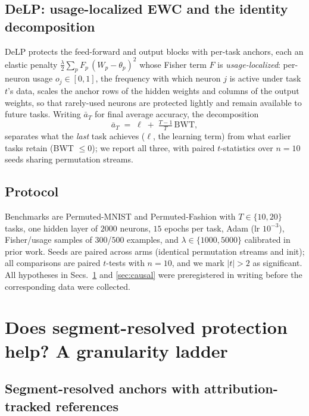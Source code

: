 \documentclass[review,12pt,number]{elsarticle}
\newcommand{\delp}{DeLP}
\begin{document}
\subsection{\delp{}: usage-localized EWC and the identity decomposition}
\label{sec:delp}

\delp{} \cite{zhou2026delp} protects the feed-forward and output blocks with
per-task anchors, each an elastic penalty
$\frac{\lambda}{2}\sum_p F_p\, (W_p - \theta_p)^2$ whose Fisher term $F$ is
\emph{usage-localized}: per-neuron usage $o_j \in [0,1]$, the frequency with
which neuron $j$ is active under task $t$'s data, scales the anchor rows of
the hidden weights and columns of the output weights, so that rarely-used
neurons are protected lightly and remain available to future tasks. Writing
$\bar a_T$ for final average accuracy, the decomposition
\begin{equation}
\bar a_T \;=\; \ell \;+\; \tfrac{T-1}{T}\,\mathrm{BWT},
\label{eq:identity}
\end{equation}
separates what the \emph{last} task achieves ($\ell$, the learning term)
from what earlier tasks retain (BWT $\le 0$); we report all three, with
paired $t$-statistics over $n{=}10$ seeds sharing permutation streams.

\subsection{Protocol}
\label{sec:protocol}

Benchmarks are Permuted-MNIST and Permuted-Fashion \cite{parisi2019,xiao2017} with
$T\in\{10,20\}$ tasks, one hidden layer of $2000$ neurons, $15$ epochs per
task, Adam (lr $10^{-3}$), Fisher/usage samples of $300$/$500$ examples, and
$\lambda \in \{1000, 5000\}$ calibrated in prior work. Seeds are paired
across arms (identical permutation streams and init); all comparisons are
paired $t$-tests with $n{=}10$, and we mark $|t|>2$ as significant. All
hypotheses in Secs.~\ref{sec:granularity} and \ref{sec:causal} were
preregistered in writing before the corresponding data were collected.

\section{Does segment-resolved protection help? A granularity ladder}
\label{sec:granularity}

\subsection{Segment-resolved anchors with attribution-tracked references}
\label{sec:branchdesign}
\end{document}
